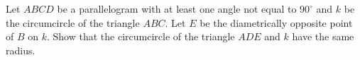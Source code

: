 Let $ABCD$ be a parallelogram with at least one angle not equal to $90^{\circ}$ and $k$ be the
circumcircle of the triangle $ABC$. Let $E$ be the diametrically opposite point of $B$ on $k$.
Show that the circumcircle of the triangle $ADE$ and $k$ have the same radius.